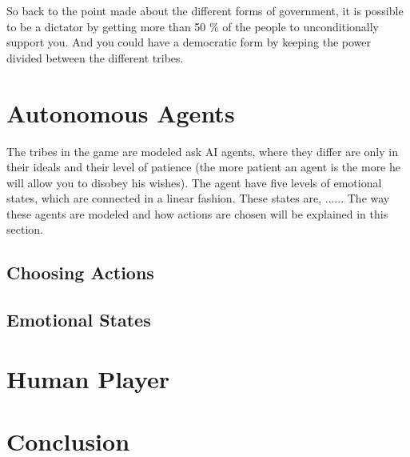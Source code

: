 \documentclass[11pt,a4paper]{article}
\begin{document}
So back to the point made about the different forms of government, it is possible to be a dictator by getting more than 50 \% of the people to unconditionally support you. And you could have a democratic form by keeping the power divided between the different tribes.

\section{Autonomous Agents}
The tribes in the game are modeled ask AI agents, where they differ are only in their ideals and their level of patience (the more patient an agent is the more he will allow you to disobey his wishes). The agent have five levels of emotional states, which are connected in a linear fashion. These states are, ...... The way these agents are modeled and how actions are chosen will be explained in this section. 

\subsection{Choosing Actions}

\subsection{Emotional States}

\section{Human Player}

\section{Conclusion}
\end{document}
